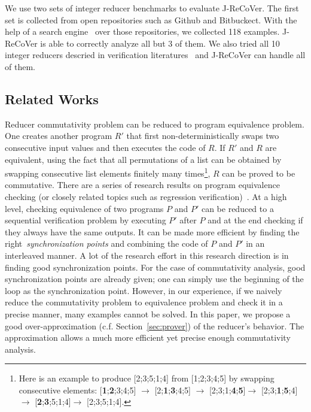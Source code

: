\documentclass{llncs}
\begin{document}
We use two sets of integer reducer benchmarks to evaluate J-ReCoVer. The first set is collected from open repositories such as Github and Bitbuckect. With the help of a search engine~\cite{searchcode} over those repositories, we collected 118 examples. J-ReCoVer is able to correctly analyze all but 3 of them. We also tried all 10 integer reducers descried in verification literatures~\cite{ChenHSW15,ChenSW16} and J-ReCoVer can handle all of them.


\subsection*{Related Works}
Reducer commutativity problem can be reduced to program equivalence problem. One creates another program $R'$ that first non-deterministically swaps two consecutive input values and then executes the code of $R$. If $R'$ and $R$ are equivalent, using the fact that all permutations of a list can be obtained by swapping consecutive list elements finitely many times\footnote{Here is an example to produce [2;3;5;1;4] from [1;2;3;4;5] by swapping consecutive elements: [\textbf{1};\textbf{2};3;4;5] $\rightarrow$ [2;\textbf{1};\textbf{3};4;5] $\rightarrow$ [2;3;1;\textbf{4};\textbf{5}]$\rightarrow$ [2;3;\textbf{1};\textbf{5};4]$\rightarrow$ [\textbf{2};\textbf{3};5;1;4]$\rightarrow$ [2;3;5;1;4].}, $R$ can be proved to be commutative. There are a series of research results on program equivalence checking (or closely related topics such as regression verification)~\cite{symdiff,fedyukovich2015automated,sharma2013data,godlin2009regression,fedyukovich2016property,felsing2014automating,KieferKlebanovUlbrich2017,lahiri2013differential,grossman2017verifying,barthe2011relational,KlebanovRuemmerUlbrich2017}. At a high level, checking equivalence of two programs $P$ and $P'$ can be reduced to a sequential verification problem by executing $P'$ after $P$ and at the end checking if they always have the same outputs. It can be made more efficient by finding the right~\emph{synchronization points} and combining the code of $P$ and $P'$ in an interleaved manner. A lot of the research effort in this research direction is in finding good synchronization points. For the case of commutativity analysis, good synchronization points are already given; one can simply use the beginning of the loop as the synchronization point. However, in our experience, if we naively reduce the commutativity problem to equivalence problem and check it in a precise manner, many examples cannot be solved. In this paper, we propose a good over-approximation (c.f. Section~\ref{sec:prover}) of the reducer's behavior. The approximation allows a much more efficient yet precise enough commutativity analysis.
\end{document}

